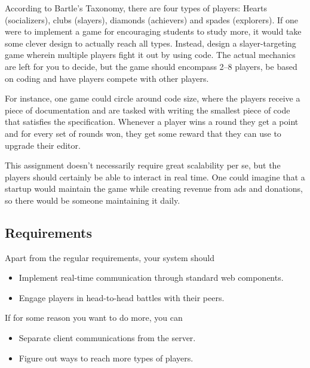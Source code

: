 \begin{refsection}
According to Bartle's Taxonomy\supercite{bartle}, there are four types of players: Hearts (socializers), clubs (slayers), diamonds (achievers) and spades (explorers). If one were to implement a game for encouraging students to study more, it would take some clever design to actually reach all types. Instead, design a slayer-targeting game wherein multiple players fight it out by using code. The actual mechanics are left for you to decide, but the game should encompass 2--8 players, be based on coding and have players compete with other players.

For instance, one game could circle around code size, where the players receive a piece of documentation and are tasked with writing the smallest piece of code that satisfies the specification. Whenever a player wins a round they get a point and for every set of rounds won, they get some reward that they can use to upgrade their editor.

This assignment doesn't necessarily require great scalability per se, but the players should certainly be able to interact in real time. One could imagine that a startup would maintain the game while creating revenue from ads and donations, so there would be someone maintaining it daily.

\subsection{Requirements}
Apart from the regular requirements, your system should
\begin{itemize}
    \item Implement real-time communication through standard web components.
    \item Engage players in head-to-head battles with their peers.
\end{itemize}
If for some reason you want to do more, you can
\begin{itemize}
    \item Separate client communications from the server.
    \item Figure out ways to reach more types of players.
\end{itemize}


\printbibliography[heading=subbibliography]

\end{refsection}
